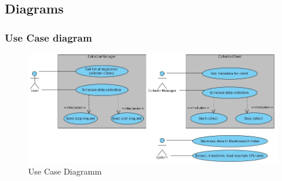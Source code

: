\appendix

\chapter{}

\section{Diagrams}
\subsection{Use Case diagram}

\begin{figure}[H]
	\centering
	\includegraphics[width=1.0\textwidth]{../uml/usecase-collector-process.jpg}
	\caption{Use Case Diagramm}
	\label{use-case-diagram}
\end{figure}


